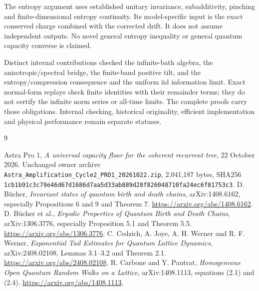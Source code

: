 \documentclass[11pt]{article}
\begin{document}
The entropy argument uses established unitary invariance, subadditivity,
pinching and finite-dimensional entropy continuity. Its model-specific
input is the exact conserved charge combined with the corrected drift.
It does not assume independent outputs. No novel general entropy
inequality or general quantum capacity converse is claimed.

Distinct internal contributions checked the infinite-bath algebra,
the anisotropic/spectral bridge, the finite-band positive tilt, and the
entropy/compression consequence and the uniform iid information limit.
Exact normal-form replays check
finite identities with their remainder terms; they do not certify the
infinite norm series or all-time limits. The complete proofs carry those
obligations. Internal checking, historical originality, efficient
implementation and physical performance remain separate statuses.

\begin{thebibliography}{9}\footnotesize\raggedright
{} Astra Pro 1, \emph{A universal capacity floor for the coherent
recurrent tree}, 22 October 2026. Unchanged owner archive
\texttt{Astra\_Amplification\_Cycle2\_PRO1\_20261022.zip},
2,041,187 bytes, SHA256
\texttt{1cb1b91c3c79e46d67d1686d7aa5d33ab889d28f826048710fa24ec6f81753c3}.
 D. B\"ucher, \emph{Invariant states of quantum birth and
death chains}, arXiv:1408.6162, especially Propositions 6 and 9 and
Theorem 7. \url{https://arxiv.org/abs/1408.6162}.
 D. B\"ucher et al., \emph{Ergodic Properties of Quantum
Birth and Death Chains}, arXiv:1306.3776, especially Proposition 5.1 and
Theorem 5.5. \url{https://arxiv.org/abs/1306.3776}.
 C. Cedzich, A. Joye, A. H. Werner and R. F. Werner,
\emph{Exponential Tail Estimates for Quantum Lattice Dynamics},
arXiv:2408.02108, Lemmas 3.1--3.2 and Theorem 2.1.
\url{https://arxiv.org/abs/2408.02108}.
 R. Carbone and Y. Pautrat,
\emph{Homogeneous Open Quantum Random Walks on a Lattice},
arXiv:1408.1113, equations (2.1) and (2.4).
\url{https://arxiv.org/abs/1408.1113}.
\end{thebibliography}
\end{document}
